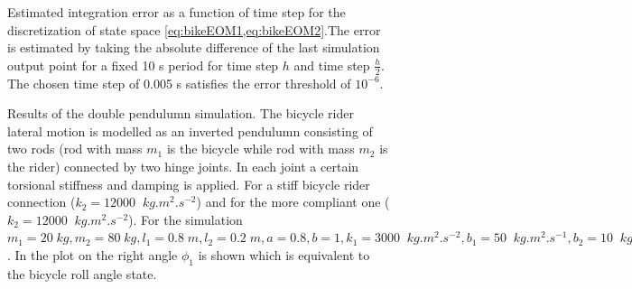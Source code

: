\begin{figure}[!h]
    \centering
        \centering
        \caption{Estimated integration error as a function of time step for the discretization of state space \cref{eq:bikeEOM1,eq:bikeEOM2}.The error is estimated by taking the absolute difference of the last simulation output point for a fixed 10 \si{\second} period for time step \ensuremath{h} and time step \ensuremath{\frac{h}{2}}. The chosen time step of 0.005 \si{s} satisfies the error threshold of \ensuremath{10^{-6}}.}       
         \label{fig:convergence}  
 \end{figure}
 \begin{figure}[h]
    \caption{ Results of the double pendulumn simulation. The bicycle rider lateral motion is modelled as an inverted pendulumn consisting of two rods (rod with mass \ensuremath{m_1} is the bicycle while rod with mass \ensuremath{m_2} is the rider) connected by two hinge joints. In each joint a certain torsional stiffness and damping is applied. For a stiff bicycle rider connection (\ensuremath{k_2=12000 \;\;\si{kg.m^2.s^{-2}}}) and for the  more compliant one (\ensuremath{k_2=12000 \;\;\si{kg.m^2.s^{-2}}}). For the simulation \ensuremath{m_1=20\; \si{kg},m_2=80 \;\si{kg},l_1=0.8 \;\si{m}, l_2=0.2\; \si{m},a=0.8,b=1  ,k_1=3000 \;\;\si{kg.m^2.s^{-2}},b_1=50 \;\;\si{kg.m^2.s^{-1}},b_2=10 \;\;\si{kg.m^2.s^{-1}}}. In the plot on the right  angle \ensuremath{\phi_1} is shown which is equivalent to the bicycle roll angle state.}
    \label{fig:dp_sim}
\end{figure}



